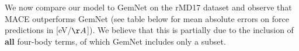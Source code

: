 \documentclass{article}
\begin{document}
We now compare our model to GemNet on the rMD17 dataset and observe that MACE outperforms GemNet (see table below for mean absolute errors on force predictions in [eV/$\AA{}$]).
We believe that this is partially due to the inclusion of \textbf{all} four-body terms, 
of which GemNet includes only a subset.
\begin{table}
  \centering
  \label{tab:md17}
\end{table}
\end{document}
